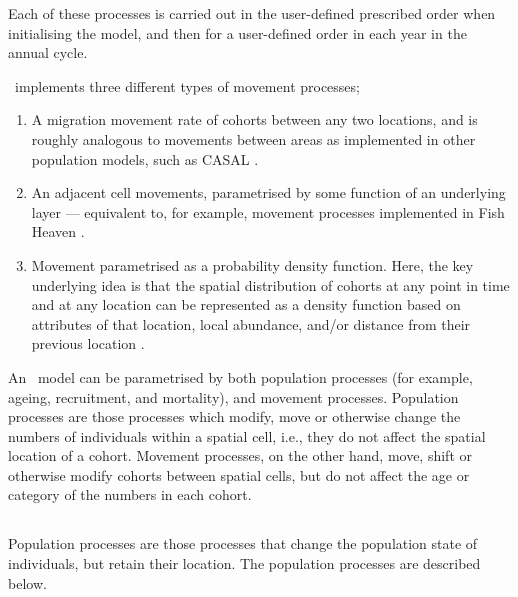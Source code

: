 Each of these processes is carried out in the user-defined prescribed order when initialising the model, and then for a user-defined order in each year in the annual cycle.

\SPM\ implements three different types of movement processes;
\begin{enumerate}
	\item  A migration movement rate of cohorts between any two locations, and is roughly analogous to movements between areas as implemented in other population models, such as CASAL \citep{1388}. 
	\item An adjacent cell movements, parametrised by some function of an underlying layer --- equivalent to, for example, movement processes implemented in Fish Heaven \citep{1136,1135}. 
	\item Movement parametrised as a probability density function. Here, the key underlying idea is that the spatial distribution of cohorts at any point in time and at any location can be represented as a density function based on attributes of that location, local abundance, and/or distance from their previous location \citep{1366,1367}. 
\end{enumerate}

An \SPM\ model can be parametrised by both population processes (for example, ageing, recruitment, and mortality), and movement processes. Population processes are those processes which modify, move or otherwise change the numbers of individuals within a spatial cell, i.e., they do not affect the spatial location of a cohort. Movement processes, on the other hand, move, shift or otherwise modify cohorts between spatial cells, but do not affect the age or category of the numbers in each cohort. 

\subsection{}

Population processes are those processes that change the population state of individuals, but retain their location. The population processes are described below.

\subsubsection{}


